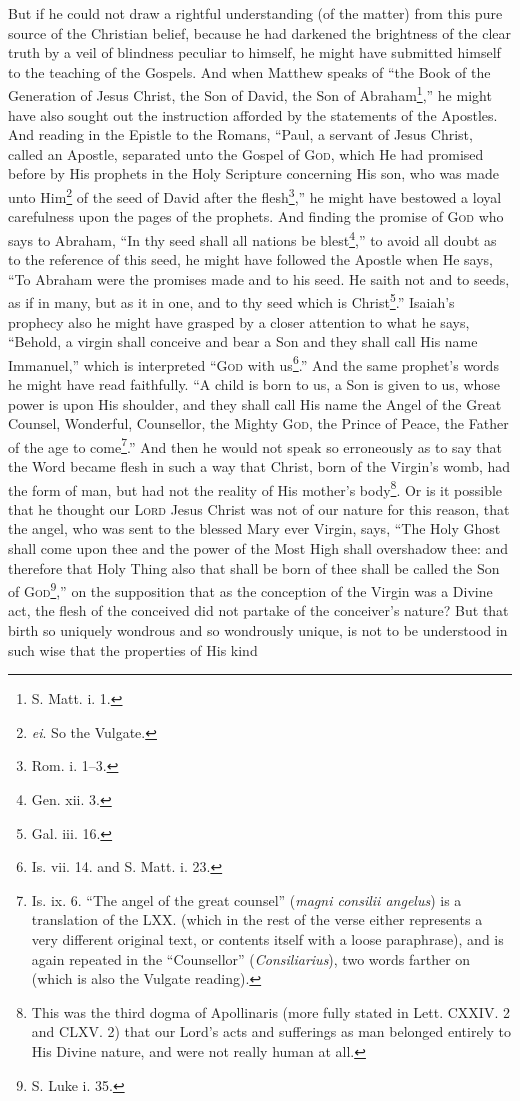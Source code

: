 But if he could not draw a rightful understanding (of the matter) from this pure source of the Christian belief, because he had darkened the brightness of the clear truth by a veil of blindness peculiar to himself, he might have submitted himself to the teaching of the Gospels. And when Matthew speaks of “the Book of the Generation of Jesus Christ, the Son of David, the Son of Abraham\footnote{S. Matt. i. 1.},” he might have also sought out the instruction afforded by the statements of the Apostles. And reading in the Epistle to the Romans, “Paul, a servant of Jesus Christ, called an Apostle, separated unto the Gospel of \textsc{God}, which He had promised before by His prophets in the Holy Scripture concerning His son, who was made unto Him\footnote{\emph{ei}. So the Vulgate.} of the seed of David after the flesh\footnote{Rom. i. 1–3.},” he might have bestowed a loyal carefulness upon the pages of the prophets. And finding the promise of \textsc{God} who says to Abraham, “In thy seed shall all nations be blest\footnote{Gen. xii. 3.},” to avoid all doubt as to the reference of this seed, he might have followed the Apostle when He says, “To Abraham were the promises made and to his seed. He saith not and to seeds, as if in many, but as it in one, and to thy seed which is Christ\footnote{Gal. iii. 16.}.” Isaiah’s prophecy also he might have grasped by a closer attention to what he says, “Behold, a virgin shall conceive and bear a Son and they shall call His name Immanuel,” which is interpreted “\textsc{God} with us\footnote{Is. vii. 14. and S. Matt. i. 23.}.” And the same prophet’s words he might have read faithfully. “A child is born to us, a Son is given to us, whose power is upon His shoulder, and they shall call His name the Angel of the Great Counsel, Wonderful, Counsellor, the Mighty \textsc{God}, the Prince of Peace, the Father of the age to come\footnote{Is. ix. 6. “The angel of the great counsel” (\emph{magni consilii angelus}) is a translation of the LXX. (which in the rest of the verse either represents a very different original text, or contents itself with a loose paraphrase), and is again repeated in the “Counsellor” (\emph{Consiliarius}), two words farther on (which is also the Vulgate reading).}.” And then he would not speak so erroneously as to say that the Word became flesh in such a way that Christ, born of the Virgin’s womb, had the form of man, but had not the reality of His mother’s body\footnote{This was the third dogma of Apollinaris (more fully stated in Lett. CXXIV. 2 and CLXV. 2) that our Lord’s acts and sufferings as man belonged entirely to His Divine nature, and were not really human at all.}. Or is it possible that he thought our \textsc{Lord} Jesus Christ was not of our nature for this reason, that the angel, who was sent to the blessed Mary ever Virgin, says, “The Holy Ghost shall come upon thee and the power of the Most High shall overshadow thee: and therefore that Holy Thing also that shall be born of thee shall be called the Son of \textsc{God\footnote{S. Luke i. 35.}},” on the supposition that as the conception of the Virgin was a Divine act, the flesh of the conceived did not partake of the conceiver’s nature? But that birth so uniquely wondrous and so wondrously unique, is not to be understood in such wise that the properties of His kind 